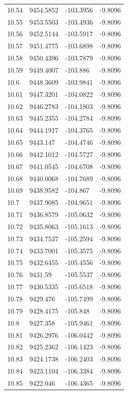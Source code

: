 \begin{table}[H]
\begin{tabular}{llll}
10.54 & 9454.5852 & -103.3956 & -9.8096 \\
10.55 & 9453.5503 & -103.4936 & -9.8096 \\
10.56 & 9452.5144 & -103.5917 & -9.8096 \\
10.57 & 9451.4775 & -103.6898 & -9.8096 \\
10.58 & 9450.4396 & -103.7879 & -9.8096 \\
10.59 & 9449.4007 & -103.886 & -9.8096 \\
10.6 & 9448.3609 & -103.9841 & -9.8096 \\
10.61 & 9447.3201 & -104.0822 & -9.8096 \\
10.62 & 9446.2783 & -104.1803 & -9.8096 \\
10.63 & 9445.2355 & -104.2784 & -9.8096 \\
10.64 & 9444.1917 & -104.3765 & -9.8096 \\
10.65 & 9443.147 & -104.4746 & -9.8096 \\
10.66 & 9442.1012 & -104.5727 & -9.8096 \\
10.67 & 9441.0545 & -104.6708 & -9.8096 \\
10.68 & 9440.0068 & -104.7689 & -9.8096 \\
10.69 & 9438.9582 & -104.867 & -9.8096 \\
10.7 & 9437.9085 & -104.9651 & -9.8096 \\
10.71 & 9436.8579 & -105.0632 & -9.8096 \\
10.72 & 9435.8063 & -105.1613 & -9.8096 \\
10.73 & 9434.7537 & -105.2594 & -9.8096 \\
10.74 & 9433.7001 & -105.3575 & -9.8096 \\
10.75 & 9432.6455 & -105.4556 & -9.8096 \\
10.76 & 9431.59 & -105.5537 & -9.8096 \\
10.77 & 9430.5335 & -105.6518 & -9.8096 \\
10.78 & 9429.476 & -105.7499 & -9.8096 \\
10.79 & 9428.4175 & -105.848 & -9.8096 \\
10.8 & 9427.358 & -105.9461 & -9.8096 \\
10.81 & 9426.2976 & -106.0442 & -9.8096 \\
10.82 & 9425.2362 & -106.1423 & -9.8096 \\
10.83 & 9424.1738 & -106.2403 & -9.8096 \\
10.84 & 9423.1104 & -106.3384 & -9.8096 \\
10.85 & 9422.046 & -106.4365 & -9.8096 \\

\end{tabular}
\end{table}
